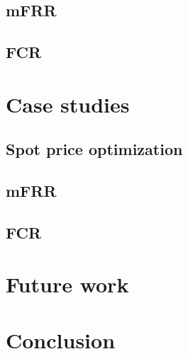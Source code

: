 \documentclass[11pt,a4paper]{article}
\begin{document}
\subsection{mFRR}

\subsection{FCR}

\section{Case studies}

\subsection{Spot price optimization}

\subsection{mFRR}

\subsection{FCR}

\section{Future work}

\section{Conclusion}
\end{document}
